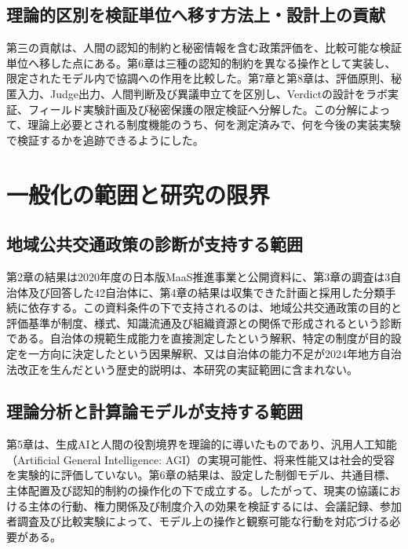\subsection{理論的区別を検証単位へ移す方法上・設計上の貢献}

第三の貢献は、人間の認知的制約と秘密情報を含む政策評価を、比較可能な検証単位へ移した点にある。第6章は三種の認知的制約を異なる操作として実装し、限定されたモデル内で協調への作用を比較した。第7章と第8章は、評価原則、秘匿入力、Judge出力、人間判断及び異議申立てを区別し、Verdictの設計をラボ実証、フィールド実験計画及び秘密保護の限定検証へ分解した。この分解によって、理論上必要とされる制度機能のうち、何を測定済みで、何を今後の実装実験で検証するかを追跡できるようにした。

\section{一般化の範囲と研究の限界}
\label{sec:ch10_limits}

\subsection{地域公共交通政策の診断が支持する範囲}

第2章の結果は2020年度の日本版MaaS推進事業と公開資料に、第3章の調査は3自治体及び回答した42自治体に、第4章の結果は収集できた計画と採用した分類手続に依存する。この資料条件の下で支持されるのは、地域公共交通政策の目的と評価基準が制度、様式、知識流通及び組織資源との関係で形成されるという診断である。自治体の規範生成能力を直接測定したという解釈、特定の制度が目的設定を一方向に決定したという因果解釈、又は自治体の能力不足が2024年地方自治法改正を生んだという歴史的説明は、本研究の実証範囲に含まれない。

\subsection{理論分析と計算論モデルが支持する範囲}

第5章は、生成AIと人間の役割境界を理論的に導いたものであり、汎用人工知能（Artificial General Intelligence: AGI）の実現可能性、将来性能又は社会的受容を実験的に評価していない。第6章の結果は、設定した制御モデル、共通目標、主体配置及び認知的制約の操作化の下で成立する。したがって、現実の協議における主体の行動、権力関係及び制度介入の効果を検証するには、会議記録、参加者調査及び比較実験によって、モデル上の操作と観察可能な行動を対応づける必要がある。

